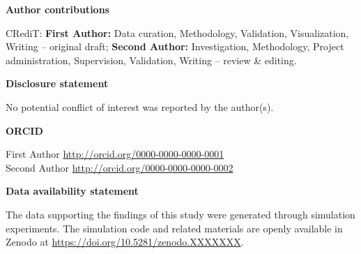 \documentclass[10pt,twocolumn]{article}
\begin{document}
\vspace{6pt}
\noindent\textbf{Author contributions}

\noindent CRediT: \textbf{First Author:} Data curation,
Methodology, Validation, Visualization, Writing -- original draft;
\textbf{Second Author:} Investigation, Methodology, Project
administration, Supervision, Validation, Writing -- review \&
editing.

\vspace{6pt}
\noindent\textbf{Disclosure statement}

\noindent No potential conflict of interest was reported by the
author(s).

\vspace{6pt}
\noindent\textbf{ORCID}

\noindent First Author 
\url{http://orcid.org/0000-0000-0000-0001}\\
Second Author 
\url{http://orcid.org/0000-0000-0000-0002}

\vspace{6pt}
\noindent\textbf{Data availability statement}

\noindent The data supporting the findings of this study were
generated through simulation experiments. The simulation code and
related materials are openly available in Zenodo at
\url{https://doi.org/10.5281/zenodo.XXXXXXX}.

\balance
\vspace{6pt}
\end{document}
